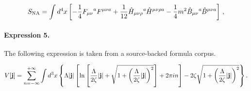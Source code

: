 \documentclass[11pt]{article}
\begin{document}
\begin{align*}S_{\rm NA}= \int d^{4}x \left[ -{1\over4} {F_{\mu\nu}}^{a} F^{\mu\nu a} +{1\over12} \hat{H}_{\mu\nu\rho}\raisebox{0.98ex}{\text{\scriptsize{$a$}}}\hat{H}^{\mu\nu\rho a} -{1\over4}m^{2}\hat{B}_{\mu\nu}\raisebox{0.98ex}{\text{\scriptsize{$a$}}}\hat{B}^{\mu\nu a} \right] \,, \end{align*}

\paragraph{Expression 5.} The following expression is taken from a source-backed formula corpus.

\begin{align*}V[{\bf j}]=\sum\limits_{n=-\infty}^{+\infty}\int d^3x\left\{\Lambda |{\bf j}|\left[\ln\left[\frac{\Lambda}{2\zeta}|{\bf j}|+\sqrt{1+\left(\frac{\Lambda}{2\zeta}|{\bf j}|\right)^2}\right]+2\pi in\right]- 2\zeta\sqrt{1+\left(\frac{\Lambda}{2\zeta}|{\bf j}|\right)^2}\right\}.\end{align*}
\end{document}

